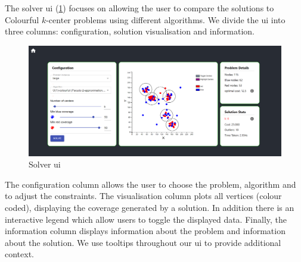 The solver \acrshort{ui} (\cref{fig:sol_vis}) focuses on allowing the user to compare the solutions to Colourful $k$-center problems using different algorithms. We divide the \acrshort{ui} into three columns: configuration, solution visualisation and information. 

\begin{figure}[H]
    \centering
    \includegraphics[width=\textwidth]{images/solver_ui/colourful_solve_zoom.png}
    \caption{Solver \acrshort{ui}}
    \label{fig:sol_vis}
\end{figure}

The configuration column allows the user to choose the problem, algorithm and to adjust the constraints. The visualisation column plots all vertices (colour coded), displaying the coverage generated by a solution. In addition there is an interactive legend which allow users to toggle the displayed data. Finally, the information column displays information about the problem and information about the solution. We use tooltips throughout our \acrshort{ui} to provide additional context.